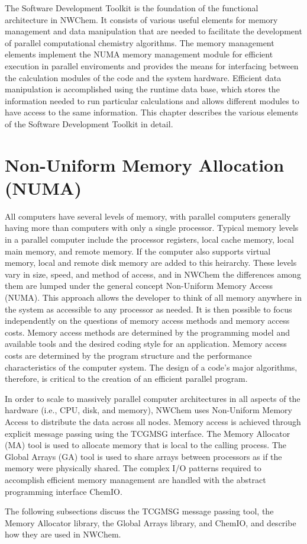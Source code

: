 \label{sec:sdt}

The Software Development Toolkit is the foundation of the functional architecture
in NWChem.  It consists of various useful elements for memory management and
data manipulation that are needed to facilitate the
development of parallel computational chemistry algorithms.  The 
memory management elements implement the NUMA memory management module
for efficient execution in parallel enviroments and provides the means 
for interfacing between the calculation modules
of the code and the system hardware.  Efficient data manipulation is
accomplished using the runtime data base, which
stores the information needed to run particular calculations and allows 
different modules to have access to the same information.
This chapter describes the various elements of the Software Development Toolkit
in detail.



\section{Non-Uniform Memory Allocation (NUMA)}
\label{sec:numa}

All computers have several levels of memory, with parallel computers generally
having more than computers with only a single processor.  Typical memory levels
in a parallel computer include the processor registers, 
local cache memory, local main memory,
and remote memory.  If the computer also supports virtual memory, local and
remote disk memory are added to this heirarchy.  These levels vary in size,
speed, and method of access, and in NWChem the differences among them are
lumped under the general concept Non-Uniform Memory Access (NUMA).  This
approach allows the developer to think of all memory anywhere in the system as
accessible to any processor as needed.  It is then possible to focus
independently on the questions of memory access methods and memory access costs.
Memory access methods are determined by the programming model and available
tools and the desired coding
style for an application.  Memory access costs are determined by the 
program structure and the performance characteristics of the computer system.
The design of a code's major algorithms, therefore, is critical to 
the creation of an efficient parallel program.

In order to scale to massively parallel computer 
architectures in all aspects of the hardware (i.e., CPU, disk,
and memory), NWChem uses Non-Uniform Memory Access
to distribute the data across all nodes.  Memory access is achieved
through explicit message passing using the TCGMSG interface.
The Memory Allocator (MA) tool is used to allocate memory that is local to
the calling process.  The Global Arrays (GA) tool is used to share
arrays between processors as if the memory were physically shared.
The complex I/O patterns required to accomplish efficient memory management
are handled with the abstract programming interface ChemIO.

The following subsections discuss the TCGMSG message passing tool,
the Memory Allocator library,  
the Global Arrays library, and ChemIO, and describe how they are used in NWChem.

